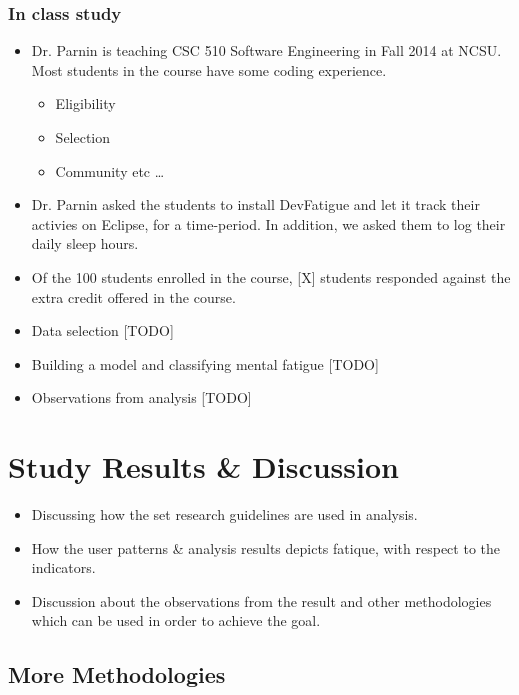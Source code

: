 \documentclass{acm_proc_article-sp}
\begin{document}
\subsubsection{In class study}
\begin{itemize}
  \item Dr. Parnin is teaching CSC 510 Software Engineering in Fall 2014 at
  NCSU. Most students in the course have some coding experience. 
  \begin{itemize}
  	\item Eligibility
  	\item Selection
  	\item Community etc \ldots
  \end{itemize}
  \item Dr. Parnin asked the students to install DevFatigue and let it track
  their activies on Eclipse, for a time-period. In addition, we asked them to
  log their daily sleep hours.
  \item Of the 100 students enrolled in the course, [X] students responded
  against the extra credit offered in the course.
  \item Data selection [TODO]
  \item Building a model and classifying mental fatigue [TODO]
  \item Observations from analysis [TODO]
\end{itemize}

\section{Study Results \& Discussion}
\begin{itemize}
  \item Discussing how the set research guidelines are used in analysis.
  \item How the user patterns \& analysis results depicts fatique, with 
  respect to the indicators.
  \item Discussion about the observations from the result and other methodologies which
can be used in order to achieve the goal.
\end{itemize}

\subsection{More Methodologies}
\end{document}
